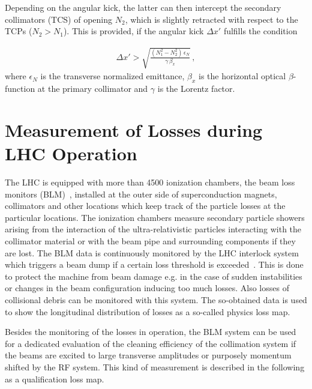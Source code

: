 Depending on the angular kick, the latter can then intercept the secondary collimators (TCS) of opening $N_2$, which is slightly retracted with respect to the TCPs ($N_2>N_1$). This is provided, if the angular kick $\Delta x'$ fulfills the condition~\cite{jeanneret1998optics}

\begin{align}
\Delta x' > \sqrt{\frac{(N_1^2 - N_2^2) \, \epsilon_N }{ \gamma \, \beta_x } } \,,
\end{align}
where $\epsilon_N$ is the transverse normalized emittance, $\beta_x$ is the horizontal optical $\beta$-function at the primary collimator and $\gamma$ is the Lorentz factor.


\section{Measurement of Losses during LHC Operation}

The LHC is equipped with more than 4500 ionization chambers, the beam loss monitors (BLM)~\cite{BLMref1,BLMref02}, installed at the outer side of superconduction magnets, collimators and other locations which keep track of the particle losses at the particular locations. The ionization chambers measure secondary particle showers arising from the interaction of the ultra-relativistic particles interacting with the collimator material or with the beam pipe and surrounding components if they are lost. The BLM data is continuously monitored by the LHC interlock system which triggers a beam dump if a certain loss threshold is exceeded~\cite{guaglio2005reliability}. This is done to protect the machine from beam damage e.g. in the case of sudden instabilities or changes in the beam configuration inducing too much losses. Also losses of collisional debris can be monitored with this system. The so-obtained data is used to show the longitudinal distribution of losses as a so-called physics loss map.

Besides the monitoring of the losses in operation, the BLM system can be used for a dedicated evaluation of the cleaning efficiency of the collimation system if the beams are excited to large transverse amplitudes or purposely momentum shifted by the RF system. This kind of measurement is described in the following as a qualification loss map.

